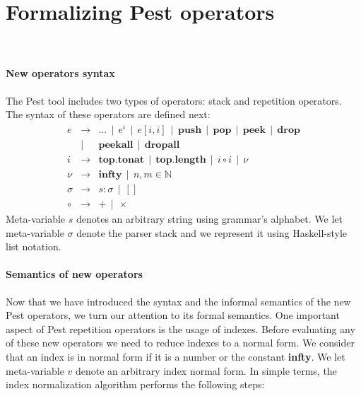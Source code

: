 \documentclass[preprint,12pt]{elsarticle}
\theoremstyle{definition}
\begin{document}
\section{Formalizing Pest operators}~\label{sec:pest-formalization}


\paragraph{New operators syntax}
The Pest tool includes two types of operators: stack and repetition operators.
The syntax of these operators are defined next:
\[
\begin{array}{lcl}
  e & \to  & ...\,\mid\,e^i\,\mid\,e[i,i]\,\mid\,\mathbf{push}\,\mid\,\mathbf{pop}\,\mid\,\mathbf{peek}
             \,\mid\,\mathbf{drop}\\
    & \mid & \mathbf{peekall}\,\mid\,\mathbf{dropall}\\
  i & \to  & \mathbf{top.tonat}\,\mid\,\mathbf{top.length}\,\mid\,i \circ i\,\mid\,\nu\\
  \nu & \to  & \mathbf{infty}\,\mid\,n,m\in\mathbb{N}\\
  \sigma & \to & s : \sigma\,\mid\,[] \\
  \circ & \to & + \,\mid\, \times
\end{array}
\]
Meta-variable $s$ denotes an arbitrary string using grammar's alphabet.
We let meta-variable $\sigma$ denote the parser stack and we represent it
using Haskell-style list notation.

\paragraph{Semantics of new operators}
Now that we have introduced the syntax and the informal semantics of the new Pest
operators, we turn our attention to its formal semantics. One important aspect
of Pest repetition operators is the usage of indexes. Before evaluating any
of these new operators we need to reduce indexes to a normal form.
We consider that an index is in normal form if it is a number or the constant
\textbf{infty}. We let meta-variable $v$ denote an arbitrary index normal form.
In simple terms, the index normalization algorithm performs the following steps:
\end{document}
